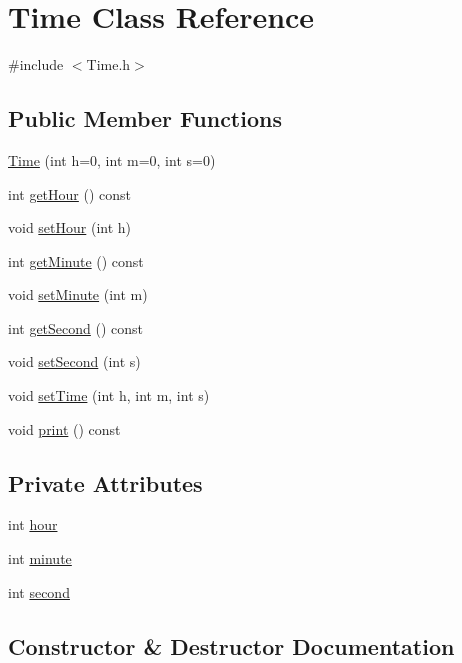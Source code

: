 \hypertarget{classTime}{}\section{Time Class Reference}
\label{classTime}


{\ttfamily \#include $<$Time.\+h$>$}

\subsection*{Public Member Functions}
\begin{DoxyCompactItemize}
\item 
\hyperlink{classTime_a0fc29d4a1be77a0f9fe1cd28c1d34958}{Time} (int h=0, int m=0, int s=0)
\item 
int \hyperlink{classTime_a4e9d93c2aaaac84b0a49f44184968860}{get\+Hour} () const 
\item 
void \hyperlink{classTime_a79e74e17893cf244e1318ceb9b1c7f32}{set\+Hour} (int h)
\item 
int \hyperlink{classTime_a6ccac73be7aacc12410cea6b3d216357}{get\+Minute} () const 
\item 
void \hyperlink{classTime_a35779c16a9db3499a27eccd58793f3b5}{set\+Minute} (int m)
\item 
int \hyperlink{classTime_adc2217366bfc4bb39eb547982747b6da}{get\+Second} () const 
\item 
void \hyperlink{classTime_a0528cf12858546b60ebb33fdcbc3fca2}{set\+Second} (int s)
\item 
void \hyperlink{classTime_ae05f94882a72debabb02e0889054d89a}{set\+Time} (int h, int m, int s)
\item 
void \hyperlink{classTime_acd9b7522e50fc667d81468219c5756e8}{print} () const 
\end{DoxyCompactItemize}
\subsection*{Private Attributes}
\begin{DoxyCompactItemize}
\item 
int \hyperlink{classTime_a497d35aa44ea40706dbab08f7a31d069}{hour}
\item 
int \hyperlink{classTime_a6c2e13147da34803a9784aa2b8bf8da8}{minute}
\item 
int \hyperlink{classTime_a63c9e64c7b453e10ba0f7f28bfedbcbf}{second}
\end{DoxyCompactItemize}


\subsection{Constructor \& Destructor Documentation}

